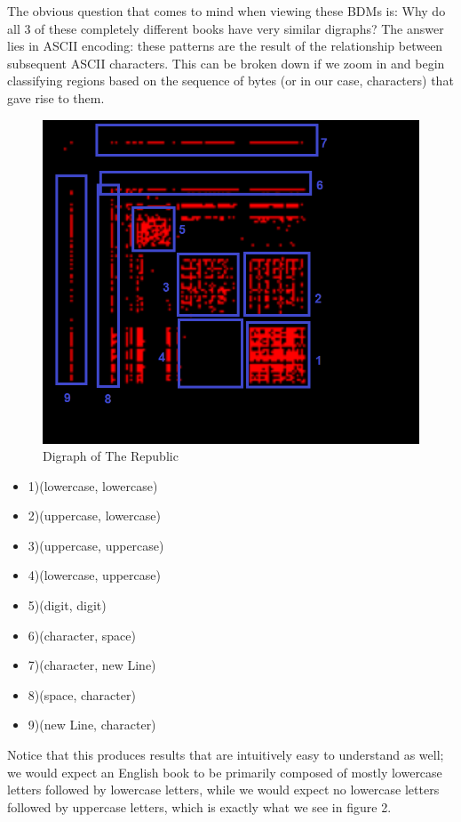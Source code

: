 \documentclass[12pt,a4paper]{article}
\begin{document}
\pagebreak
The obvious question that comes to mind when viewing these BDMs is: Why do all 3 of these completely different books have very similar digraphs? The answer lies in ASCII encoding: these patterns are the result of the relationship between subsequent ASCII characters. This can be broken down if we zoom in and begin classifying regions based on the sequence of bytes (or in our case, characters) that gave rise to them. 


\begin{minipage}{0.6\textwidth}
	\begin{figure}[H]
		\includegraphics[scale=0.45]{images/RepublicZoom.png} 
		\caption{Digraph of The Republic}
	\end{figure}
\end{minipage} \hfill
\begin{minipage}{0.45\textwidth}
	\begin{itemize}
		\item 1)(lowercase, lowercase)
		\item 2)(uppercase, lowercase)
		\item 3)(uppercase, uppercase)
		\item 4)(lowercase, uppercase)
		\item 5)(digit, digit)
		\item 6)(character, space)
		\item 7)(character, new Line)
		\item 8)(space, character)
		\item 9)(new Line, character)
	\end{itemize}
\end{minipage}
\linebreak\linebreak\linebreak
Notice that this produces results that are intuitively easy to understand as well; we would expect an English book to be primarily composed of mostly lowercase letters followed by lowercase letters, while we would expect no lowercase letters followed by uppercase letters, which is exactly what we see in figure 2. 
\end{document}
